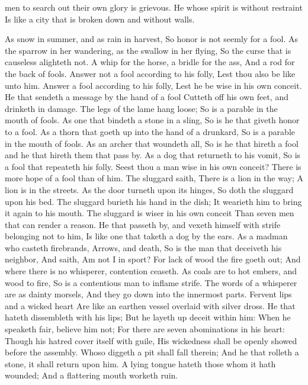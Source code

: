 men to search out their own glory is grievous.  He whose spirit is without restraint Is like a city that is broken down and without walls. 

As snow in summer, and as rain in harvest, So honor is not seemly for a fool.  As the sparrow in her wandering, as the swallow in her flying, So the curse that is causeless alighteth not.  A whip for the horse, a bridle for the ass, And a rod for the back of fools.  Answer not a fool according to his folly, Lest thou also be like unto him.  Answer a fool according to his folly, Lest he be wise in his own conceit.  He that sendeth a message by the hand of a fool Cutteth off his own feet, and drinketh in damage.  The legs of the lame hang loose; So is a parable in the mouth of fools.  As one that bindeth a stone in a sling, So is he that giveth honor to a fool.  As a thorn that goeth up into the hand of a drunkard, So is a parable in the mouth of fools.  As an archer that woundeth all, So is he that hireth a fool and he that hireth them that pass by.  As a dog that returneth to his vomit, So is a fool that repeateth his folly.  Seest thou a man wise in his own conceit? There is more hope of a fool than of him.  The sluggard saith, There is a lion in the way; A lion is in the streets.  As the door turneth upon its hinges, So doth the sluggard upon his bed.  The sluggard burieth his hand in the dish; It wearieth him to bring it again to his mouth.  The sluggard is wiser in his own conceit Than seven men that can render a reason.  He that passeth by, and vexeth himself with strife belonging not to him, Is like one that taketh a dog by the ears.  As a madman who casteth firebrands, Arrows, and death,  So is the man that deceiveth his neighbor, And saith, Am not I in sport?  For lack of wood the fire goeth out; And where there is no whisperer, contention ceaseth.  As coals are to hot embers, and wood to fire, So is a contentious man to inflame strife.  The words of a whisperer are as dainty morsels, And they go down into the innermost parts.  Fervent lips and a wicked heart Are like an earthen vessel overlaid with silver dross.  He that hateth dissembleth with his lips; But he layeth up deceit within him:  When he speaketh fair, believe him not; For there are seven abominations in his heart:  Though his hatred cover itself with guile, His wickedness shall be openly showed before the assembly.  Whoso diggeth a pit shall fall therein; And he that rolleth a stone, it shall return upon him.  A lying tongue hateth those whom it hath wounded; And a flattering mouth worketh ruin. 


